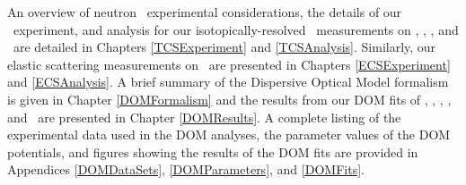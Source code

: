 An overview of neutron \tot\ experimental considerations, the details of our 
\tot\ experiment, and analysis for our isotopically-resolved \tot\ measurements
on \oSixEight, \niEightFour, \rhThree, and \snTwelveFour\ are detailed in 
Chapters \ref{TCSExperiment} and \ref{TCSAnalysis}. Similarly, our elastic scattering measurements 
on \snTwelveFour\ are presented in Chapters \ref{ECSExperiment} and \ref{ECSAnalysis}. A brief 
summary of the Dispersive Optical Model formalism is
given in Chapter \ref{DOMFormalism} and the results from our DOM fits of \oSixEight, 
\caAughtEight, \niEightFour, \snTwelveFour, and \pbEight\ are presented in Chapter \ref{DOMResults}. 
A complete listing of the experimental data used in the DOM analyses, the
parameter values of the DOM potentials, and figures showing the 
results of the DOM fits are provided in Appendices \ref{DOMDataSets},
\ref{DOMParameters}, and \ref{DOMFits}. 
